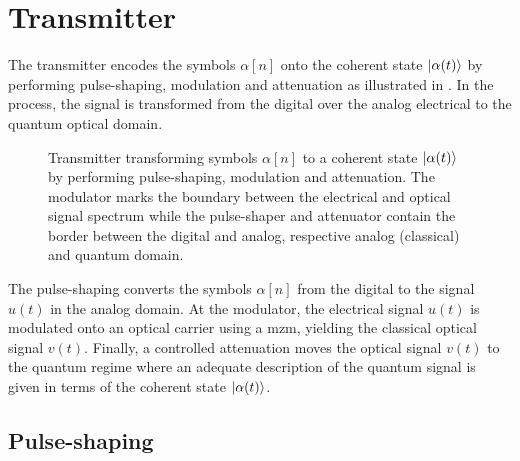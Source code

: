 \section{Transmitter}

The transmitter encodes the symbols $\alpha[n]$ onto the coherent state $\ket{\alpha(t)}$ by performing pulse-shaping, modulation and attenuation as illustrated in .
In the process, the signal is transformed from the digital over the analog electrical to the quantum optical domain.
\begin{figure}[htb]
	\centering
	
	\caption{Transmitter transforming symbols $\alpha[n]$ to a coherent state $\ket{\alpha(t)}$ by performing pulse-shaping, modulation and attenuation. The modulator marks the boundary between the electrical and optical signal spectrum while the pulse-shaper and attenuator contain the border between the digital and analog, respective analog (classical) and quantum domain.}\label{fig:transmitter}
\end{figure}
The pulse-shaping converts the symbols $\alpha[n]$ from the digital to the signal $u(t)$ in the analog domain.
At the modulator, the electrical signal $u(t)$ is modulated onto an optical carrier using a \gls{mzm}, yielding the classical optical signal $v(t)$.
Finally, a controlled attenuation moves the optical signal $v(t)$ to the quantum regime where an adequate description of the quantum signal is given in terms of the coherent state $\ket{\alpha(t)}$.

\subsection{Pulse-shaping}

